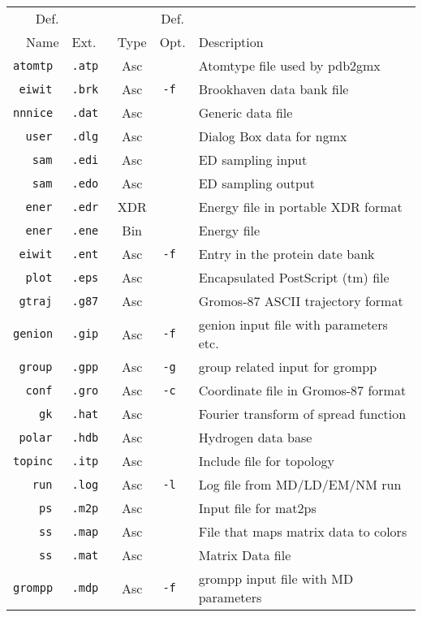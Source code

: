 \begin{table}[p]
\begin{tabularx}{\linewidth}{rlccX}
\hline
   Def. &       &      &  Def. & \\
   Name &  Ext. & Type &  Opt. & Description \\
\hline
\tt  atomtp &\tt .atp & Asc &\tt    & Atomtype file used by pdb2gmx \\
\tt   eiwit &\tt .brk & Asc &\tt -f & Brookhaven data bank file \\
\tt  nnnice &\tt .dat & Asc &\tt    & Generic data file \\
\tt    user &\tt .dlg & Asc &\tt    & Dialog Box data for ngmx \\
\tt     sam &\tt .edi & Asc &\tt    & ED sampling input \\
\tt     sam &\tt .edo & Asc &\tt    & ED sampling output \\
\tt    ener &\tt .edr & XDR &\tt    & Energy file in portable XDR format \\
\tt    ener &\tt .ene & Bin &\tt    & Energy file \\
\tt   eiwit &\tt .ent & Asc &\tt -f & Entry in the protein date bank \\
\tt    plot &\tt .eps & Asc &\tt    & Encapsulated PostScript (tm) file \\
\tt   gtraj &\tt .g87 & Asc &\tt    & Gromos-87 ASCII trajectory format \\
\tt  genion &\tt .gip & Asc &\tt -f & genion input file with parameters etc. \\
\tt   group &\tt .gpp & Asc &\tt -g & group related input for grompp \\
\tt    conf &\tt .gro & Asc &\tt -c & Coordinate file in Gromos-87 format \\
\tt      gk &\tt .hat & Asc &\tt    & Fourier transform of spread function \\
\tt   polar &\tt .hdb & Asc &\tt    & Hydrogen data base \\
\tt  topinc &\tt .itp & Asc &\tt    & Include file for topology \\
\tt     run &\tt .log & Asc &\tt -l & Log file from MD/LD/EM/NM run \\
\tt      ps &\tt .m2p & Asc &\tt    & Input file for mat2ps \\
\tt      ss &\tt .map & Asc &\tt    & File that maps matrix data to colors \\
\tt      ss &\tt .mat & Asc &\tt    & Matrix Data file \\
\tt  grompp &\tt .mdp & Asc &\tt -f & grompp input file with MD parameters \\

\end{tabularx}
\end{table}
